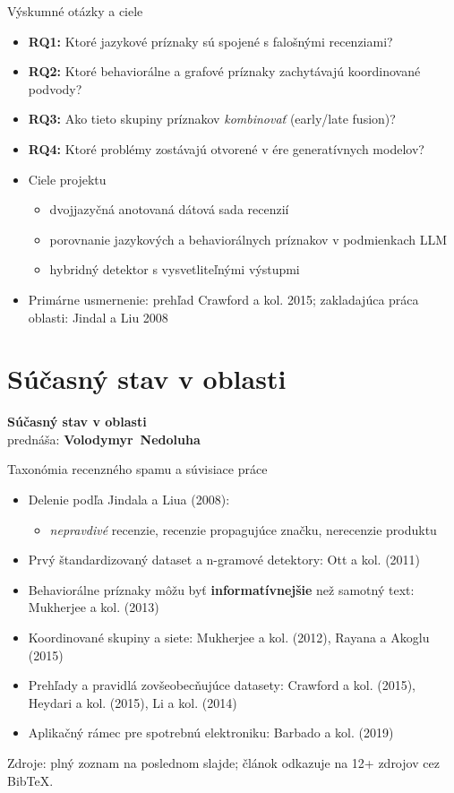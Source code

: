 \documentclass[10pt]{beamer}
\newcommand{\emp}[1]{\textit{\alert{#1}}}
\newcommand{\kw}[1]{\mbox{\textbf{#1}}}
\begin{document}
\begin{frame}{Výskumné otázky a ciele}
\begin{itemize}
\item \kw{RQ1:} Ktoré jazykové príznaky sú spojené s falošnými recenziami?
\item \kw{RQ2:} Ktoré behaviorálne a grafové príznaky zachytávajú koordinované podvody?
\item \kw{RQ3:} Ako tieto skupiny príznakov \emp{kombinovať} (early/late fusion)?
\item \kw{RQ4:} Ktoré problémy zostávajú otvorené v ére generatívnych modelov?
\item Ciele projektu
  \begin{itemize}
  \item dvojjazyčná anotovaná dátová sada recenzií
  \item porovnanie jazykových a behaviorálnych príznakov v podmienkach LLM
  \item hybridný detektor s vysvetliteľnými výstupmi
  \end{itemize}
\item Primárne usmernenie: prehľad Crawford a kol. 2015; zakladajúca práca oblasti: Jindal a Liu 2008
\end{itemize}
\end{frame}

\section{Súčasný stav v oblasti}
\begin{frame}[plain]
  \centering
  {\LARGE\bfseries Súčasný stav v oblasti}\\[3mm]
  {\large prednáša: \kw{Volodymyr Nedoluha}}
\end{frame}

\begin{frame}{Taxonómia recenzného spamu a súvisiace práce}
\begin{itemize}
\item Delenie podľa Jindala a Liua (2008):
  \begin{itemize}
  \item \emp{nepravdivé} recenzie, recenzie propagujúce značku, nerecenzie produktu
  \end{itemize}
\item Prvý štandardizovaný dataset a n-gramové detektory: Ott a kol. (2011)
\item Behaviorálne príznaky môžu byť \kw{informatívnejšie} než samotný text: Mukherjee a kol. (2013)
\item Koordinované skupiny a siete: Mukherjee a kol. (2012), Rayana a Akoglu (2015)
\item Prehľady a pravidlá zovšeobecňujúce datasety: Crawford a kol. (2015), Heydari a kol. (2015), Li a kol. (2014)
\item Aplikačný rámec pre spotrebnú elektroniku: Barbado a kol. (2019)
\end{itemize}
\vfill
{\tiny Zdroje: plný zoznam na poslednom slajde; článok odkazuje na 12+ zdrojov cez BibTeX.}
\end{frame}
\end{document}
